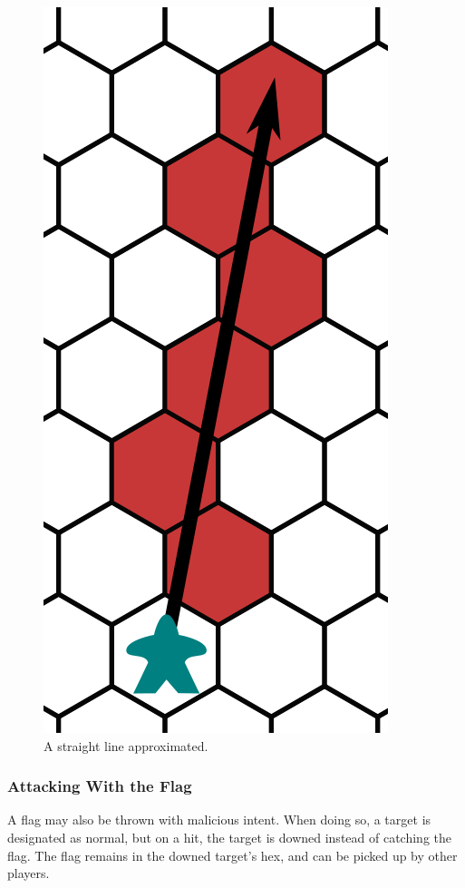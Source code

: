 \begin{figure}
    \centering
    \includegraphics{graphics/throwing-cropped.png}
    \caption{A straight line approximated.}
    \label{fig:line-throw}
\end{figure}

\subsubsection{Attacking With the Flag} 
A flag may also be thrown with malicious intent.
When doing so, a target is designated as normal, but on a hit, the target is downed instead of catching the flag.
The flag remains in the downed target's hex, and can be picked up by other players.

